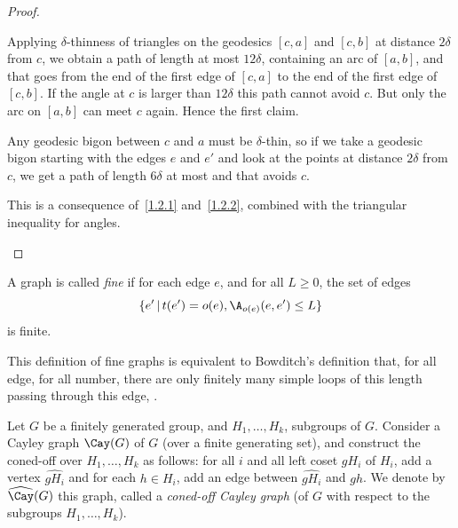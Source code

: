 \begin{proof}
\begin{step}[\eqref{1.2.1}]
Applying $\delta$-thinness of triangles on the
geodesics $[c,a]$ and $[c, b]$ at distance $2\delta$ from $c$, we obtain a path of length at most $12\delta$, containing an arc of $[a,b]$, and that goes from the end of the first edge of $[c,a]$ to the end of the first edge of $[c,b]$. If the angle at $c$ is larger than $12\delta$ this path cannot avoid $c$. But only the arc on $[a,b]$ can meet $c$ again. Hence the first claim.
\end{step}

\begin{step}[\eqref{1.2.2}]
Any geodesic bigon between $c$ and $a$ must be $\delta$-thin, so if we take a geodesic bigon starting with the edges $e$ and $e'$ and look at the points at distance $2\delta$ from $c$, we get a path of length $6\delta$ at most and that avoids $c$.
\end{step}

\begin{laststep}[\eqref{1.2.3}]
This is a consequence of~\eqref{1.2.1} and~\eqref{1.2.2}, combined with the triangular inequality for angles.
\end{laststep}
\let\qed\relax
\end{proof}

\begin{defi}
A graph is called \emph{fine} if for each edge $e$, and for all $L\geq 0$, the set of edges
\[
\{ e'\,|\,t(e')=o(e), \A_{o(e)}(e, e') \leq L\}
\]
is finite.
\end{defi}

This definition of fine graphs is equivalent to Bowditch's definition that, for all edge, for all number, there are only finitely many simple loops of this length passing through this edge, \cite{BowRH}.


\begin{defi}
Let $G$ be a finitely generated group, and $H_1, \dots, H_k$,
subgroups of $G$. Consider a Cayley graph $\Cay(G)$ of $G$ (over a finite generating set), and construct the coned-off over $H_1, \dots, H_k$ as follows: for all $i$ and all left coset $gH_i$ of $H_i$, add a vertex $\widehat{gH_i}$ and for each $h\in H_i$, add an edge between $\widehat{gH_i}$ and $gh$. We denote by $\widehat{{\Cay}} (G)$ this graph, called a \emph{coned-off Cayley graph} (of $G$ with respect to the subgroups $H_1, \dots, H_k$).
\end{defi}

